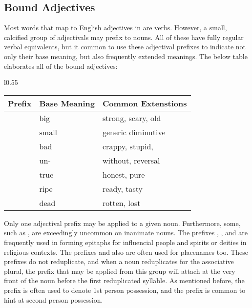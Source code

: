  \subsection{Bound Adjectives}
  Most words that map to English adjectives in \langname are verbs. However, a small, calcified group of adjectivals may prefix to nouns. All of these have fully regular verbal equivalents, but it common to use these adjectival prefixes to indicate not only their base meaning, but also frequently extended meanings. The below table elaborates all of the bound adjectives:
  \vertspace
  \begin{wrapfigure}{l}{0.55\textwidth}
    \begin{tabular}{|l|l|l|}
      \hline
      Prefix                   & Base Meaning & Common Extenstions   \\ \hline \hline
      \prefixtext{\boundbig}   & big          & strong, scary, old   \\
      \prefixtext{\boundsmall} & small        & generic diminutive  \\
      \prefixtext{\boundbad}   & bad          & crappy, stupid,    \\
      \prefixtext{\boundneg}   & un-          & without, reversal    \\
      \prefixtext{\boundtrue}  & true         & honest, pure         \\
      \prefixtext{\boundripe}  & ripe         & ready, tasty         \\
      \prefixtext{\bounddead}  & dead         & rotten, lost         \\ \hline
    \end{tabular}
  \end{wrapfigure}
  Only one adjectival prefix may be applied to a given noun. Furthermore, some, such as \prefixtext{\bounddead}, are exceedingly uncommon on inanimate nouns. The prefixes \prefixtext{\boundbig}, \prefixtext{\boundsmall}, and \prefixtext{\boundtrue} are frequently used in forming epitaphs for influencial people and spirits or deities in religious contexts. The prefixes \prefixtext{\boundripe} and \prefixtext{\boundbig} also are often used for placenames too. These prefixes do not reduplicate, and when a noun reduplicates for the associative plural, the prefix that may be applied from this group will attach at the very front of the noun before the first reduplicated syllable. As mentioned before, the \prefixtext{\boundbad} prefix is often used to denote 1st person possession, and the \prefixtext{\boundtrue} prefix is common to hint at second person possession.
  \vertspace

